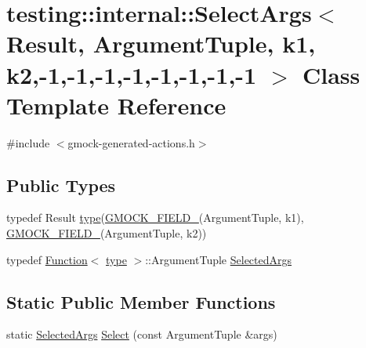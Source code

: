 \hypertarget{classtesting_1_1internal_1_1_select_args_3_01_result_00_01_argument_tuple_00_01k1_00_01k2_00-1_014202daea627b6852873e503b1bfe3a0}{}\section{testing\+:\+:internal\+:\+:Select\+Args$<$ Result, Argument\+Tuple, k1, k2,-\/1,-\/1,-\/1,-\/1,-\/1,-\/1,-\/1,-\/1 $>$ Class Template Reference}
\label{classtesting_1_1internal_1_1_select_args_3_01_result_00_01_argument_tuple_00_01k1_00_01k2_00-1_014202daea627b6852873e503b1bfe3a0}


{\ttfamily \#include $<$gmock-\/generated-\/actions.\+h$>$}

\subsection*{Public Types}
\begin{DoxyCompactItemize}
\item 
typedef Result \hyperlink{classtesting_1_1internal_1_1_select_args_3_01_result_00_01_argument_tuple_00_01k1_00_01k2_00-1_014202daea627b6852873e503b1bfe3a0_a6a6ef276f21d62d535a5c64dba751801}{type}(\hyperlink{gmock-generated-actions_8h_a6eb3ce92b0613603057a20ec9e593317}{G\+M\+O\+C\+K\+\_\+\+F\+I\+E\+L\+D\+\_\+}(Argument\+Tuple, k1), \hyperlink{gmock-generated-actions_8h_a6eb3ce92b0613603057a20ec9e593317}{G\+M\+O\+C\+K\+\_\+\+F\+I\+E\+L\+D\+\_\+}(Argument\+Tuple, k2))
\item 
typedef \hyperlink{structtesting_1_1internal_1_1_function}{Function}$<$ \hyperlink{classtesting_1_1internal_1_1_select_args_3_01_result_00_01_argument_tuple_00_01k1_00_01k2_00-1_014202daea627b6852873e503b1bfe3a0_a6a6ef276f21d62d535a5c64dba751801}{type} $>$\+::Argument\+Tuple \hyperlink{classtesting_1_1internal_1_1_select_args_3_01_result_00_01_argument_tuple_00_01k1_00_01k2_00-1_014202daea627b6852873e503b1bfe3a0_ab3c711ab2b55d52ff660d1830f987268}{Selected\+Args}
\end{DoxyCompactItemize}
\subsection*{Static Public Member Functions}
\begin{DoxyCompactItemize}
\item 
static \hyperlink{classtesting_1_1internal_1_1_select_args_3_01_result_00_01_argument_tuple_00_01k1_00_01k2_00-1_014202daea627b6852873e503b1bfe3a0_ab3c711ab2b55d52ff660d1830f987268}{Selected\+Args} \hyperlink{classtesting_1_1internal_1_1_select_args_3_01_result_00_01_argument_tuple_00_01k1_00_01k2_00-1_014202daea627b6852873e503b1bfe3a0_a151cf6edfedb245173fdb33699e822cf}{Select} (const Argument\+Tuple \&args)
\end{DoxyCompactItemize}


